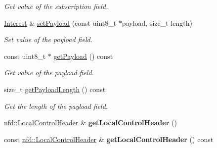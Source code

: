 \begin{DoxyCompactItemize}
\begin{DoxyCompactList}\small\item\em Get value of the subscription field. \end{DoxyCompactList}\item 
\hyperlink{classndn_1_1Interest}{Interest} \& \hyperlink{classndn_1_1Interest_aaf69ead631601d49c5afbd8abe85e209}{set\+Payload} (const uint8\+\_\+t $\ast$payload, size\+\_\+t length)\hypertarget{classndn_1_1Interest_aaf69ead631601d49c5afbd8abe85e209}{}\label{classndn_1_1Interest_aaf69ead631601d49c5afbd8abe85e209}

\begin{DoxyCompactList}\small\item\em Set value of the payload field. \end{DoxyCompactList}\item 
const uint8\+\_\+t $\ast$ \hyperlink{classndn_1_1Interest_ad32b53fe333a3670ef9a6f81f88b6207}{get\+Payload} () const\hypertarget{classndn_1_1Interest_ad32b53fe333a3670ef9a6f81f88b6207}{}\label{classndn_1_1Interest_ad32b53fe333a3670ef9a6f81f88b6207}

\begin{DoxyCompactList}\small\item\em Get value of the payload field. \end{DoxyCompactList}\item 
size\+\_\+t \hyperlink{classndn_1_1Interest_a51bc693e4e5253703c449076fe57e046}{get\+Payload\+Length} () const\hypertarget{classndn_1_1Interest_a51bc693e4e5253703c449076fe57e046}{}\label{classndn_1_1Interest_a51bc693e4e5253703c449076fe57e046}

\begin{DoxyCompactList}\small\item\em Get the length of the payload field. \end{DoxyCompactList}\item 
\hyperlink{classndn_1_1nfd_1_1LocalControlHeader}{nfd\+::\+Local\+Control\+Header} \& {\bfseries get\+Local\+Control\+Header} ()\hypertarget{classndn_1_1Interest_a4ad0f6e1945c77d1937b8d65b01c47a8}{}\label{classndn_1_1Interest_a4ad0f6e1945c77d1937b8d65b01c47a8}

\item 
const \hyperlink{classndn_1_1nfd_1_1LocalControlHeader}{nfd\+::\+Local\+Control\+Header} \& {\bfseries get\+Local\+Control\+Header} () const\hypertarget{classndn_1_1Interest_a000fc43cef632aea523e85eed595006f}{}\label{classndn_1_1Interest_a000fc43cef632aea523e85eed595006f}


\end{DoxyCompactItemize}
